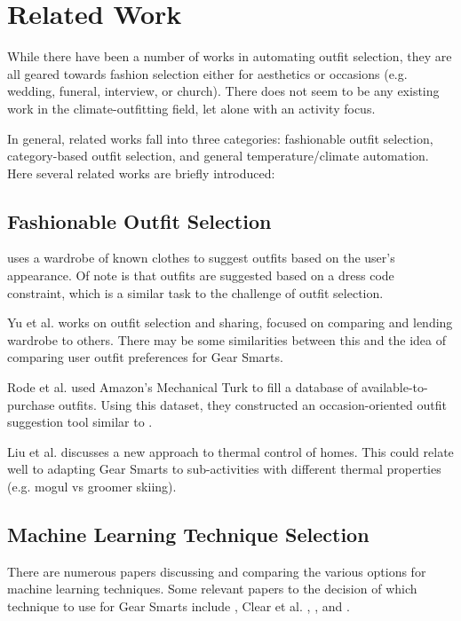 \section{Related Work}
\label{section:relatedwork}
While there have been a number of works in automating outfit selection, they are all geared towards
fashion selection either for aesthetics or occasions (e.g. wedding, funeral, interview, or church).
There does not seem to be any existing work in the climate-outfitting field, let alone with an
activity focus.

In general, related works fall into three categories: fashionable outfit selection, category-based
outfit selection, and general temperature/climate automation. Here several related works are briefly introduced:

\subsection{Fashionable Outfit Selection}
\cite{Dressup} uses a wardrobe of known clothes to suggest outfits based on the user's appearance.
Of note is that outfits are suggested based on a dress code constraint, which is a similar task to
the challenge of outfit selection.

Yu et al. \cite{SmartCloset} works on outfit selection and sharing, focused on comparing and lending wardrobe
to others. There may be some similarities between this and the idea of comparing user outfit preferences
for Gear Smarts.

Rode et al. \cite{MagicCloset} used Amazon's Mechanical Turk to fill a database of available-to-purchase outfits.
Using this dataset, they constructed an occasion-oriented outfit suggestion tool similar to \cite{Dressup}.

Liu et al. \cite{ThermalComfort} discusses a new approach to thermal control of homes. This could relate well to
adapting Gear Smarts to sub-activities with different thermal properties (e.g. mogul vs groomer skiing).

\subsection{Machine Learning Technique Selection}
There are numerous papers discussing and comparing the various options for machine learning techniques.
Some relevant papers to the decision of which technique to use for Gear Smarts include \cite{ML:MapReduceClusters},
Clear et al. \cite{ML:ManufacturingSystems}, \cite{ML:IPTraffic}, and \cite{ML:GeoMapping}.
